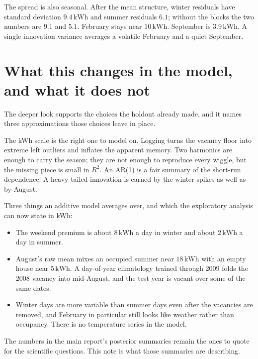 \documentclass[11pt]{article}
\newcommand{\kwh}{\,\mathrm{kWh}}
\begin{document}
The spread is also seasonal. After the mean structure, winter residuals have
standard deviation $9.4\kwh$ and summer residuals $6.1$; without the blocks
the two numbers are $9.1$ and $5.1$. February stays near $10\kwh$. September
is $3.9\kwh$. A single innovation variance averages a volatile February and a
quiet September.

\section{What this changes in the model, and what it does not}

The deeper look supports the choices the holdout already made, and it names
three approximations those choices leave in place.

The kWh scale is the right one to model on. Logging turns the vacancy floor
into extreme left outliers and inflates the apparent memory. Two harmonics are
enough to carry the season; they are not enough to reproduce every wiggle, but
the missing piece is small in $R^2$. An AR(1) is a fair summary of the
short-run dependence. A heavy-tailed innovation is earned by the winter spikes
as well as by August.

Three things an additive model averages over, and which the exploratory
analysis can now state in kWh:

\begin{itemize}
\item The weekend premium is about $8\kwh$ a day in winter and about $2\kwh$
a day in summer.
\item August's raw mean mixes an occupied summer near $18\kwh$ with an empty
house near $5\kwh$. A day-of-year climatology trained through 2009 folds the
2008 vacancy into mid-August, and the test year is vacant over some of the
same dates.
\item Winter days are more variable than summer days even after the vacancies
are removed, and February in particular still looks like weather rather than
occupancy. There is no temperature series in the model.
\end{itemize}

The numbers in the main report's posterior summaries remain the ones to quote
for the scientific questions. This note is what those summaries are describing.
\end{document}
